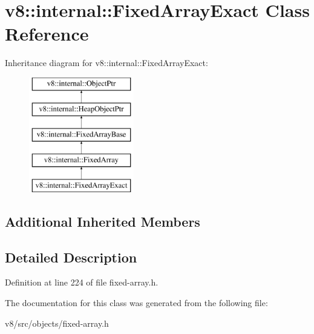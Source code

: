 \hypertarget{classv8_1_1internal_1_1FixedArrayExact}{}\section{v8\+:\+:internal\+:\+:Fixed\+Array\+Exact Class Reference}
\label{classv8_1_1internal_1_1FixedArrayExact}
Inheritance diagram for v8\+:\+:internal\+:\+:Fixed\+Array\+Exact\+:\begin{figure}[H]
\begin{center}
\leavevmode
\includegraphics[height=5.000000cm]{classv8_1_1internal_1_1FixedArrayExact}
\end{center}
\end{figure}
\subsection*{Additional Inherited Members}


\subsection{Detailed Description}


Definition at line 224 of file fixed-\/array.\+h.



The documentation for this class was generated from the following file\+:\begin{DoxyCompactItemize}
\item 
v8/src/objects/fixed-\/array.\+h\end{DoxyCompactItemize}
